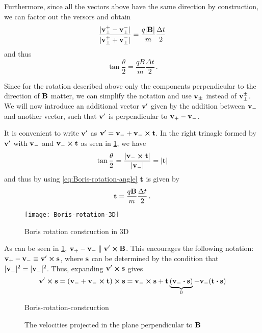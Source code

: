 \documentclass[12pt, class=report, crop=false]{standalone}
\begin{document}
Furthermore, since all the vectors above have the same direction by construction,
we can factor out the versors and obtain
\[
\frac{|\vb{v}^+_\perp - \vb{v}^-_\perp|}{|\vb{v}^+_\perp + \vb{v}^-_\perp|} =
\frac{q |\vb{B}|}{m} \frac{\Delta t}{2}
\]
and thus
\begin{equation}
  \label{eq:Boris-rotation-angle}
  \tan{\frac{\theta}{2}} = \frac{q B}{m} \frac{\Delta t}{2}\,.
\end{equation}

Since for the rotation described above only the components perpendicular to
the direction of \(\vb{B}\) matter, we can simplify the notation and use
\(\vb{v}_\pm\) instead of \(\vb{v}^\pm_\perp\).
We will now introduce an additional vector \(\vb{v}'\) given by the addition
between \(\vb{v}_-\) and another vector, such that \(\vb{v}'\) is perpendicular
to \(\vb{v}_+ - \vb{v}_-\).

It is convenient to write \(\vb{v}'\) as \(\vb{v}' = \vb{v}_- + \vb{v}_- \cp \vb{t}\).
In the right trinagle formed by \(\vb{v}'\) with \(\vb{v}_-\)
and \(\vb{v}_- \cp \vb{t}\) as seen in \cref{fig:Boris-rotation-3D},
we have
\[
\tan{\frac{\theta}{2}} = \frac{|\vb{v}_- \cp \vb{t}|}{|\vb{v}_-|} = |\vb{t}|
\]
and thus by using \cref{eq:Boris-rotation-angle} \(\vb{t}\) is given by
\[
\vb{t} = \frac{q \vb{B}}{m} \frac{\Delta t}{2}\,.
\]

\begin{figure}[H]
  \texttt{[image: Boris-rotation-3D]}
  \caption{Boris rotation construction in 3D}%
  \label{fig:Boris-rotation-3D}%
\end{figure}

As can be seen in \cref{fig:Boris-rotation-3D},
\(\vb{v}_+ - \vb{v}_- \parallel \vb{v}' \cp \vb{B}\). This encourages
the following notation: \(\vb{v}_+ - \vb{v}_- \equiv \vb{v}' \cp \vb{s}\),
where \(\vb{s}\) can be determined by the condition that
\(|\vb{v}_+|^2 = |\vb{v}_-|^2\). Thus, expanding \(\vb{v}' \cp \vb{s}\) gives
\[
\vb{v}' \cp \vb{s} = (\vb{v}_- + \vb{v}_- \cp \vb{t}) \cp \vb{s} =
\vb{v}_- \cp \vb{s} + \vb{t} \underbrace{(\vb{v}_- \vdot \vb{s})}_0 - \vb{v}_- (\vb{t} \vdot \vb{s})
\]

\begin{wrapfigure}[15]{r}{0.4\textwidth}
  \centering
  {Boris-rotation-construction}%
  \caption{The velocities projected in the plane perpendicular to \(\vb{B}\)}\label{fig:Boris-rotation-construction}%
\end{wrapfigure}
\end{document}
